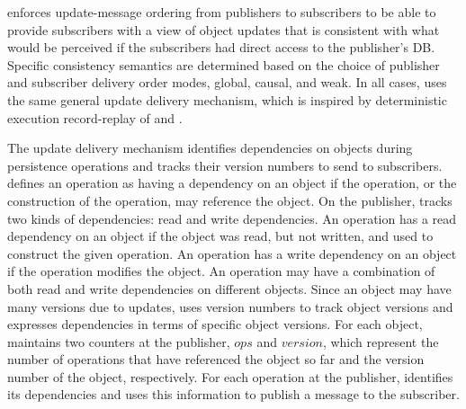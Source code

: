 \synapse enforces update-message ordering from publishers to
subscribers to be able to provide subscribers with a view of object updates that 
is consistent with what would be perceived if the subscribers had
direct access to the publisher's DB.  Specific consistency
semantics are determined based on the choice of publisher and
subscriber delivery order modes, global, causal, and weak.  In all
cases, \synapse uses the same general update delivery mechanism,
which is inspired by deterministic execution record-replay of \scribe and \dora.

The update delivery mechanism identifies dependencies on objects during persistence
operations and tracks their version numbers to send to subscribers.  \synapse defines an
operation as having a dependency on an object if the operation, or the
construction of the operation, may reference the object.  On the publisher,
\synapse tracks two kinds of dependencies: read and write dependencies.  An
operation has a read dependency on an object if the object was read,
but not written, and used to
 construct the given operation.  An operation has a write dependency
on an object if the operation modifies the object.  An operation may have a
combination of both read and write dependencies on different objects.
Since an object may have many
versions due to updates, \synapse uses version numbers to track object
versions and expresses dependencies in terms of specific object versions.  For
each object, \synapse maintains two counters at the publisher, $ops$ and
$version$, which represent the number of operations that have referenced the
object so far and the version number of the object, respectively.  For each
operation at the publisher, \synapse identifies its dependencies and uses this
information to publish a message to the subscriber.  

